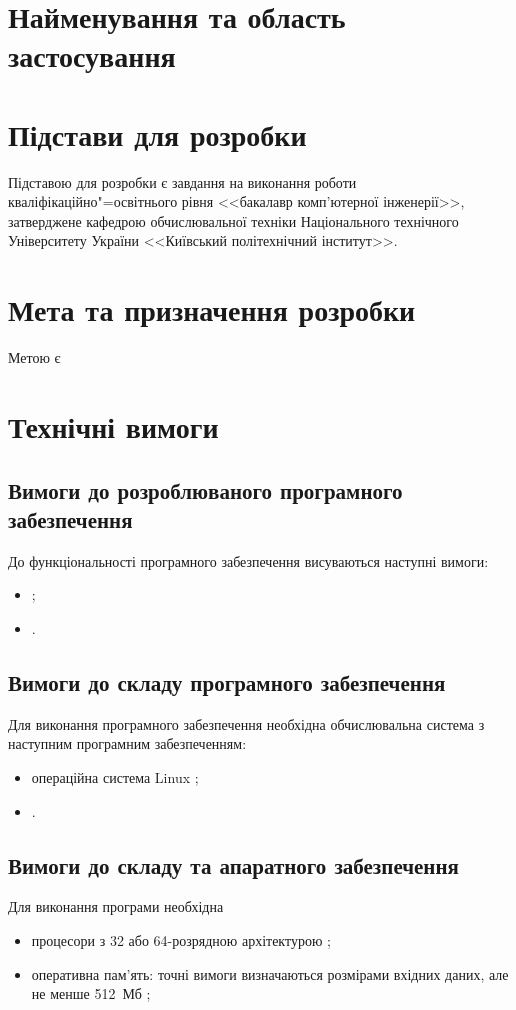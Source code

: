 \documentclass[ukrainian,utf8,pointsubsection,simple]{eskdtext}
\begin{document}
\newpage
{}
\tableofcontents
\newpage

\section{Найменування та область застосування}
\TBD

\section{Підстави для розробки}
\TBD Підставою для розробки є завдання на виконання роботи кваліфікаційно"=освітнього
рівня <<бакалавр комп'ютерної інженерії>>, затверджене кафедрою обчислювальної
техніки Національного технічного Університету України <<Київський політехнічний
інститут>>.

\section{Мета та призначення розробки}
Метою є \TBD

\section{Технічні вимоги}
\subsection{Вимоги до розроблюваного програмного забезпечення}
До функціональності програмного забезпечення висуваються наступні вимоги:
\begin{itemize}
\item \TBD;

\item \TBD.

\end{itemize}

\subsection{Вимоги до складу програмного забезпечення}
Для виконання програмного забезпечення необхідна обчислювальна система з
наступним програмним забезпеченням:
\begin{itemize}
\item операційна система Linux \TBD;

\item \TBD.
\end{itemize}

\subsection{Вимоги до складу та апаратного забезпечення}
Для виконання програми необхідна \TBD
\begin{itemize}
\item процесори з 32 або 64-розрядною архітектурою \TBD;

\item оперативна пам'ять: точні вимоги визначаються розмірами вхідних даних, але не менше 512~Мб \TBD;

\end{itemize}
\end{document}
